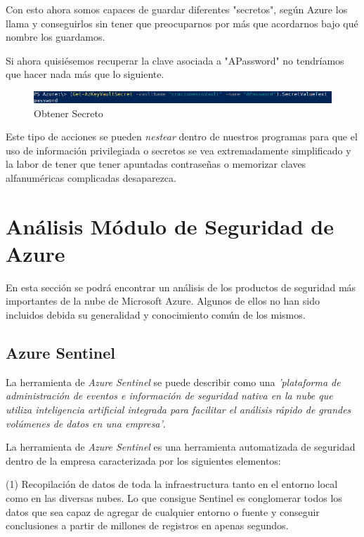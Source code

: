 \documentclass[english,runningheads,a4paper]{llncs}[2018/03/10]
\begin{document}
Con esto ahora somos capaces de guardar diferentes "secretos", según Azure los
llama y conseguirlos sin tener que preocuparnos por más que acordarnos bajo qué
nombre los guardamos.

Si ahora quisiésemos recuperar la clave asociada a "APassword" no tendríamos que
hacer nada más que lo siguiente.

\begin{figure}[h!]
    \includegraphics[width=\linewidth]{./Seguridad/Azure/Selection_013.png}
    \caption{Obtener Secreto}
\end{figure}

Este tipo de acciones se pueden \textit{nestear} dentro de nuestros programas
para que el uso de información privilegiada o secretos se vea extremadamente
simplificado y la labor de tener que tener apuntadas contraseñas o memorizar
claves alfanuméricas complicadas desaparezca.

\section*{Análisis Módulo de Seguridad de Azure}

En esta sección se podrá encontrar un análisis de los productos de seguridad más
importantes de la nube de Microsoft Azure. Algunos de ellos no han
sido incluidos debida su generalidad y conocimiento común de los mismos. 

\subsection*{Azure Sentinel}

La herramienta de \textit{Azure Sentinel} se puede describir como una
\textit{'plataforma de administración de eventos e información de seguridad
nativa en la nube que utiliza inteligencia artificial integrada para facilitar
el análisis rápido de grandes volúmenes de datos en una empresa'}. 

La herramienta de \textit{Azure Sentinel} es una herramienta automatizada de 
seguridad dentro
de la empresa caracterizada por los siguientes elementos:

(1) Recopilación de datos de toda la infraestructura tanto en el entorno local
como en las diversas nubes. Lo que consigue Sentinel es conglomerar todos los
datos que sea capaz de agregar de cualquier entorno o fuente y conseguir
conclusiones a partir de millones de registros en apenas segundos. 
\end{document}
